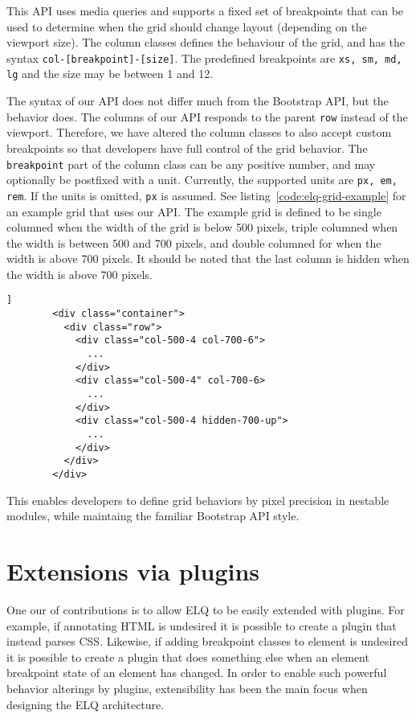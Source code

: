 \documentclass{acm_proc_article-sp}
\newcommand{\code}[1]{\texttt{#1}}
\newcommand{\elq}{ELQ}
\begin{document}
      This API uses media queries and supports a fixed set of breakpoints that can be used to determine when the grid should change layout (depending on the viewport size).
      The column classes defines the behaviour of the grid, and has the syntax \code{col-[breakpoint]-[size]}.
      The predefined breakpoints are \code{xs, sm, md, lg} and the size may be between 1 and 12.

      The syntax of our API does not differ much from the Bootstrap API, but the behavior does.
      The columns of our API responds to the parent \code{row} instead of the viewport.
      Therefore, we have altered the column classes to also accept custom breakpoints so that developers have full control of the grid behavior.
      The \code{breakpoint} part of the column class can be any positive number, and may optionally be postfixed with a unit.
      Currently, the supported units are \code{px, em, rem}.
      If the units is omitted, \code{px} is assumed.
      See listing~\ref{code:elq-grid-example} for an example grid that uses our API.
      The example grid is defined to be single columned when the width of the grid is below 500 pixels, triple columned when the width is between 500 and 700 pixels, and double columned for when the width is above 700 pixels.
      It should be noted that the last column is hidden when the width is above 700 pixels.

      \begin{lstlisting}[gobble=8,caption={},captionpos=b,label={code:elq-grid-example}]]
        <div class="container">
          <div class="row">
            <div class="col-500-4 col-700-6">
              ...
            </div>
            <div class="col-500-4" col-700-6>
              ...
            </div>
            <div class="col-500-4 hidden-700-up">
              ...
            </div>
          </div>
        </div>
      \end{lstlisting}

      This enables developers to define grid behaviors by pixel precision in nestable modules, while maintaing the familiar Bootstrap API style.


\section{Extensions via plugins}
  One our of contributions is to allow \elq{} to be easily extended with plugins.
  For example, if annotating HTML is undesired it is possible to create a plugin that instead parses CSS.
  Likewise, if adding breakpoint classes to element is undesired it is possible to create a plugin that does something else when an element breakpoint state of an element has changed.
  In order to enable such powerful behavior alterings by plugins, extensibility has been the main focus when designing the \elq{} architecture.
\end{document}
